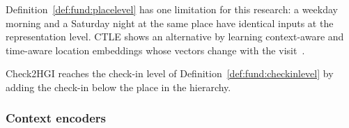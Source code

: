 Definition~\ref{def:fund:placelevel} has one limitation for this research: a
weekday morning and a Saturday night at the same place have identical inputs at the
representation level. CTLE shows an alternative by learning context-aware and
time-aware location embeddings whose vectors change with the
visit~\cite{lin2021ctle}.

Check2HGI reaches the check-in level of Definition~\ref{def:fund:checkinlevel} by
adding the check-in below the place in the hierarchy.

\subsubsection{Context encoders}

